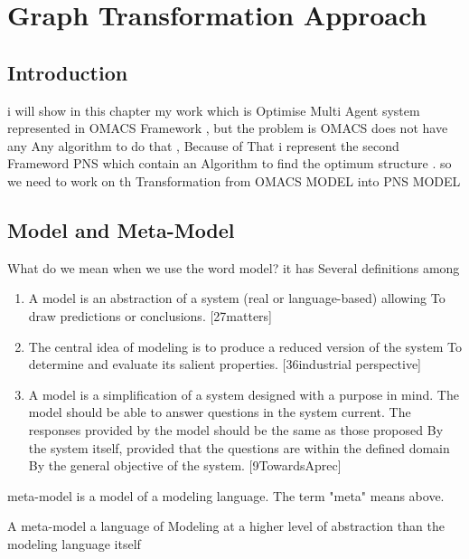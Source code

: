 
\chapter{\label{cha: Graph Transformation Approach }Graph Transformation Approach}

\section{ Introduction }
i will show in this chapter my work which is Optimise Multi Agent system  
represented in OMACS Framework , but the problem is OMACS does not have any 
Any algorithm to do that , Because of That i represent the second Frameword PNS which contain an Algorithm 
to find the optimum structure . so we need to work on th Transformation from OMACS MODEL into PNS MODEL



 
\section{Model and Meta-Model }

What do we mean when we use the word model? it has Several definitions
among

\begin{enumerate}
\item A model is an abstraction of a system (real or language-based) allowing
To draw predictions or conclusions. \cite{ch3-matters}[27matters]
\item The central idea of ​​modeling is to produce a reduced version of the system
To determine and evaluate its salient properties. \cite{ch3-selic}[36industrial perspective]

\item A model is a simplification of a system designed with a purpose in mind.
The model should be able to answer questions in the system
current. The responses provided by the model should be the same as those proposed By the system itself, provided that the questions are within the defined domain By the general objective of the system. \cite{ch3-def} [9TowardsAprec]



\end{enumerate}

meta-model is a model of a modeling language.
The term "meta" means above.

A meta-model  a language of Modeling at a higher level of abstraction than the modeling language itself
  
